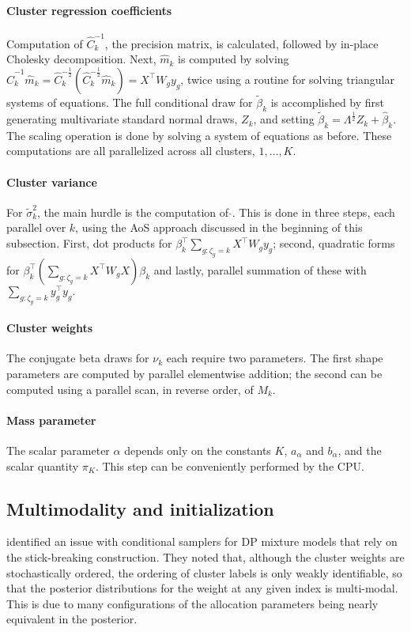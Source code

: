 \paragraph{Cluster regression coefficients}
Computation of
$\hat{C}_k^{-1}$, the precision matrix, is calculated, followed
by in-place Cholesky decomposition. Next, $\hat{m}_k$ is computed
by solving
$\hat{C}_k^{-1}\hat{m}_k=\hat{C}_k^{-\frac{1}{2}}\left(\hat{C}_k^{-\frac{1}{2}}\hat{m}_k\right)
= X^\top W_g y_g$, twice using a routine for solving triangular
systems of equations. The full conditional draw for $\tilde{\beta}_k$ is
accomplished by first generating multivariate standard normal draws, $Z_k$, and setting $\tilde{\beta}_k =
\Lambda^{\frac{1}{2}} Z_k + \hat{\beta}_k$. The scaling operation is
done by solving a system of equations as before. These
computations are all parallelized across all clusters, $1,\ldots,K$.

\paragraph{Cluster variance}
For $\tilde{\sigma}^2_k$, the main hurdle is the computation of
$\hat{}$. This is done in three steps, each parallel over $k$, using
the AoS approach discussed in the beginning of this subsection. First,
dot products for $\beta_k^\top \sum_{g:\zeta_g=k}X^\top W_g y_g$;
second, quadratic forms for $\beta_k^\top\left( \sum_{g:\zeta_g=k}
  X^\top W_g X \right) \beta_k$ and lastly, parallel summation of
these with $\sum_{g:\zeta_g=k}y_g^\top y_g.$

\paragraph{Cluster weights}

The conjugate beta draws for $\nu_k$ each require two parameters. The
first shape parameters are computed by parallel elementwise addition;
the second can be computed using a parallel scan, in reverse order, of $M_k$.

\paragraph{Mass parameter}

The scalar parameter $\alpha$ depends only on the constants $K$, $a_\alpha$ and $b_\alpha$, and the scalar quantity $\pi_K$. This step can be conveniently performed by the CPU.



\subsection{Multimodality and initialization}
\label{subsec:initialization}
\citet{papas} identified an issue with conditional samplers for DP
mixture models that rely on the stick-breaking construction. They
noted that, although the cluster weights are stochastically
ordered, the ordering of cluster labels is only weakly identifiable,
so that the posterior distributions for the weight at any given index
is multi-modal. This is due to many configurations of the allocation
parameters being nearly equivalent in the posterior. 

